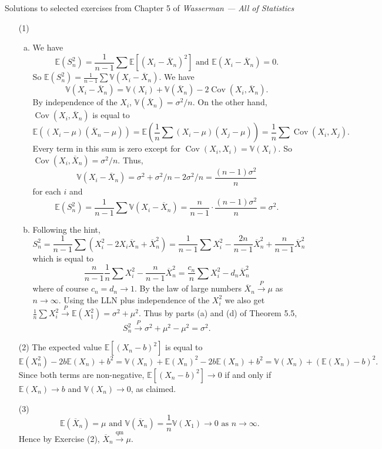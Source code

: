 \documentclass[10pt]{article}
\newcommand{\V}{\mathbb{V}}
\newcommand{\E}{\mathbb{E}}
\newcommand{\Cov}{\operatorname{Cov}}
\newcommand{\toP}{\xrightarrow{P}}
\newcommand{\toqm}{\xrightarrow{\text{qm}}}
\begin{document}
\noindent \large{Solutions to selected exercises from Chapter 5 of
\emph{Wasserman --- All of Statistics}}

\begin{enumerate}
\item[(1)]
\begin{enumerate}[(a)]
\item We have
\[
\E(S_n^2) = \frac{1}{n-1} \sum \E[(X_i - \overline X_n)^2] \text{ and }
\E(X_i-\overline X_n) = 0.
\]
So $\E(S_n^2)=\frac{1}{n-1} \sum \V(X_i - \overline X_n)$. We have
\[
\V(X_i-\overline X_n)=\V(X_i) + \V(\overline X_n) - 2\Cov(X_i,\overline X_n).
\]
By independence of the $X_i$, $\V(\overline X_n)=\sigma^2/n$. On the other hand,
$\Cov(X_i, \overline X_n)$ is equal to
\[
\E((X_i-\mu)(\overline X_n-\mu)) =
\E\left(\frac{1}{n}\sum (X_i-\mu) (X_j-\mu)\right) = \frac{1}{n}\sum \Cov(X_i,X_j).
\]
Every term in this sum is zero except for $\Cov(X_i,X_i)=\V(X_i)$. So
$\Cov(X_i,\overline X_n)=\sigma^2/n$. Thus,
\[
\V(X_i-\overline X_n)=\sigma^2 + \sigma^2/n-2\sigma^2/n = \frac{(n-1)\sigma^2}{n}
\]
for each $i$ and
\[
\E(S_n^2)=\frac{1}{n-1} \sum \V(X_i - \overline X_n) =
\frac{n}{n-1}\cdot \frac{(n-1)\sigma^2}{n} = \sigma^2.
\]

\item Following the hint,
\[
S_n^2 = \frac{1}{n-1} \sum (X_i^2 - 2X_i \overline X_n + \overline X_n^2) =
\frac{1}{n-1} \sum X_i^2 - \frac{2n}{n-1} \overline X_n^2 + \frac{n}{n-1}\overline X_n^2
\]
which is equal to
\[
\frac{n}{n-1} \frac{1}{n} \sum X_i^2 - \frac{n}{n-1} \overline X_n^2
= \frac{c_n}{n} \sum X_i^2 - d_n \overline X_n^2
\]
where of course $c_n=d_n\to 1$. By the law of large numbers $\overline X_n\toP\mu$
as $n\to\infty$. Using the LLN plus independence of the $X_i^2$ we also get
$\frac{1}{n}\sum X_i^2 \toP \E(X_1^2)=\sigma^2+\mu^2$. Thus by parts (a) and (d)
of Theorem 5.5,
\[
S_n^2 \toP \sigma^2+\mu^2 - \mu^2 = \sigma^2.
\]
\end{enumerate}

\item[(2)]
The expected value $\E[(X_n-b)^2]$ is equal to
\[
\E(X_n^2) - 2b\E(X_n) + b^2 =
\V(X_n) + \E(X_n)^2 - 2b\E(X_n) + b^2 = \V(X_n) + (\E(X_n) - b)^2.
\]
Since both terms are non-negative, $\E[(X_n-b)^2]\to 0$ if and only if
$\E(X_n)\to b$ and $\V(X_n)\to 0$, as claimed.

\item[(3)]
\[
\E(\overline X_n) = \mu \text{ and } \V(\overline X_n) = \frac{1}{n} \V(X_1) \to 0
\text{ as } n\to\infty.
\]
Hence by Exercise (2), $\overline X_n \toqm \mu$.


\end{enumerate}
\end{document}
